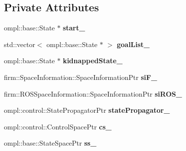 \subsection*{Private Attributes}
\begin{DoxyCompactItemize}
\item 
\hypertarget{class_f_i_r_m_aruco2_d_r_o_s_setup_a55b6f110497d8337130db5927d79e2d4}{ompl\-::base\-::\-State $\ast$ {\bfseries start\-\_\-}}\label{class_f_i_r_m_aruco2_d_r_o_s_setup_a55b6f110497d8337130db5927d79e2d4}

\item 
\hypertarget{class_f_i_r_m_aruco2_d_r_o_s_setup_a18b6def4def32aeb4a7af28616e388a1}{std\-::vector$<$ ompl\-::base\-::\-State $\ast$ $>$ {\bfseries goal\-List\-\_\-}}\label{class_f_i_r_m_aruco2_d_r_o_s_setup_a18b6def4def32aeb4a7af28616e388a1}

\item 
\hypertarget{class_f_i_r_m_aruco2_d_r_o_s_setup_a37da5e25b562ec18adef4f1b4a7b8b3f}{ompl\-::base\-::\-State $\ast$ {\bfseries kidnapped\-State\-\_\-}}\label{class_f_i_r_m_aruco2_d_r_o_s_setup_a37da5e25b562ec18adef4f1b4a7b8b3f}

\item 
\hypertarget{class_f_i_r_m_aruco2_d_r_o_s_setup_a228fe2d0b51d15f3604452bfeb76244e}{firm\-::\-Space\-Information\-::\-Space\-Information\-Ptr {\bfseries si\-F\-\_\-}}\label{class_f_i_r_m_aruco2_d_r_o_s_setup_a228fe2d0b51d15f3604452bfeb76244e}

\item 
\hypertarget{class_f_i_r_m_aruco2_d_r_o_s_setup_a922efe3cf2820e08df7d8303c110b66e}{firm\-::\-R\-O\-S\-Space\-Information\-::\-Space\-Information\-Ptr {\bfseries si\-R\-O\-S\-\_\-}}\label{class_f_i_r_m_aruco2_d_r_o_s_setup_a922efe3cf2820e08df7d8303c110b66e}

\item 
\hypertarget{class_f_i_r_m_aruco2_d_r_o_s_setup_aefeb0ee1d30d887364dcfae2ab524b5d}{ompl\-::control\-::\-State\-Propagator\-Ptr {\bfseries state\-Propagator\-\_\-}}\label{class_f_i_r_m_aruco2_d_r_o_s_setup_aefeb0ee1d30d887364dcfae2ab524b5d}

\item 
\hypertarget{class_f_i_r_m_aruco2_d_r_o_s_setup_a8c6be8acc8cf827400cc41170f432c9d}{ompl\-::control\-::\-Control\-Space\-Ptr {\bfseries cs\-\_\-}}\label{class_f_i_r_m_aruco2_d_r_o_s_setup_a8c6be8acc8cf827400cc41170f432c9d}

\item 
\hypertarget{class_f_i_r_m_aruco2_d_r_o_s_setup_a40779d3b133223f81ef3e218a5d90612}{ompl\-::base\-::\-State\-Space\-Ptr {\bfseries ss\-\_\-}}\label{class_f_i_r_m_aruco2_d_r_o_s_setup_a40779d3b133223f81ef3e218a5d90612}


\end{DoxyCompactItemize}
